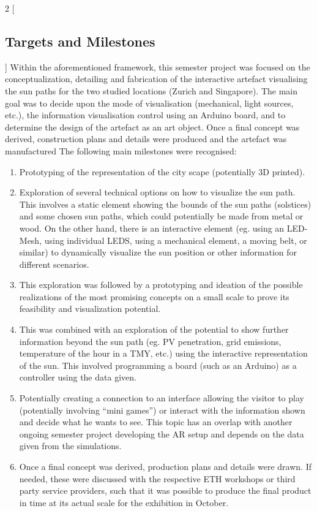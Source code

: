 \documentclass[a4paper,9pt]{article}
\begin{document}
\begin{multicols}{2}
[
    \subsection{Targets and Milestones}
    ]
Within the aforementioned framework, this semester project was focused on the conceptualization, detailing and fabrication of the interactive artefact visualising the sun paths for the two studied locations (Zurich and Singapore).
The main goal was to decide upon the mode of visualisation (mechanical, light sources, etc.), the information visualisation control using an Arduino board, and to determine the design of the artefact as an art object. Once a final concept was derived, construction plans and details were produced and the artefact was manufactured
The following main milestones were recognised:
\end{multicols}
\begin{enumerate}
    \item Prototyping of the representation of the city scape (potentially 3D printed).
    \item Exploration of several technical options on how to visualize the sun path. This involves a static element showing the bounds of the sun paths (solstices) and some chosen sun paths, which could potentially be made from metal or wood. On the other hand, there is an interactive element (eg. using an LED-Mesh, using individual LEDS, using a mechanical element, a moving belt, or similar) to dynamically visualize the sun position or other information for different scenarios.
    \item This exploration was followed by a prototyping and ideation of the possible realizations of the most promising concepts on a small scale to prove its feasibility and visualization potential.
    \item This was combined with an exploration of the potential to show further information beyond the sun path (eg. PV penetration, grid emissions, temperature of the hour in a TMY, etc.) using the interactive representation of the sun. This involved programming a board (such as an Arduino) as a controller using the data given.
    \item Potentially creating a connection to an interface allowing the visitor to play (potentially involving “mini games”) or interact with the information shown and decide what he wants to see. This topic has an overlap with another ongoing semester project developing the AR setup and depends on the data given from the simulations.
    \item Once a final concept was derived, production plans and details were drawn. If needed, these were discussed with the respective ETH workshops or third party service providers, such that it was possible to produce the final product in time at its actual scale for the exhibition in October.
\end{enumerate}
\end{document}

